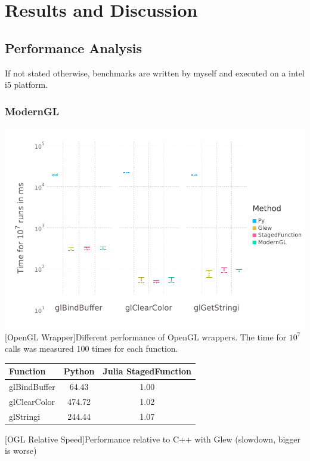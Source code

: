 \section{Results and Discussion}

\subsection{Performance Analysis}
If not stated otherwise, benchmarks are written by myself and executed on a intel i5 platform.

\subsubsection{ModernGL}
\vspace{1em}
\begin{minipage}{\linewidth}
    \centering
    \includegraphics[width=0.9\linewidth]{graphics/glbench.pdf}
    [OpenGL Wrapper]{Different performance of OpenGL wrappers. The time for $10^7$ calls was measured 100 times for each function.}
    \label{fig:openglwrapper}
\end{minipage}

\vspace{1em}

\begin{table}[htbp]
    \centering
    \begin{tabular}{l|c|c}
    	\hline
		\textbf{Function} 	& \textbf{Python} 	 & \textbf{Julia StagedFunction} \\
		\hline
		glBindBuffer 		& 64.43  & 1.00 \\
		glClearColor 		& 474.72 & 1.02 \\
		glStringi 			& 244.44  & 1.07 \\
    \end{tabular}
	[OGL Relative Speed]{Performance relative to C++ with Glew (slowdown, bigger is worse)}
    \label{table:relativespeedoglw}
\end{table}

